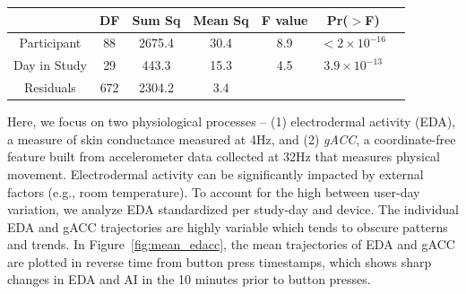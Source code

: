 \documentclass[12pt]{amsart}
\begin{document}
\begin{table}[!th]
\begin{tabular}{ccccccc}\hline
      & DF & Sum Sq & Mean Sq & F value & Pr($>$F) \\ \hline
        Participant & 88 & 2675.4 & 30.4 & 8.9 & $< 2 \times 10^{-16}$ \\
        Day in Study & 29 & 443.3 & 15.3 & 4.5 & $3.9 \times 10^{-13}$ \\
        Residuals & 672 & 2304.2 & 3.4 \\ \hline
      \end{tabular}  
      \label{tab:anova}
\end{table}

Here, we focus on two physiological processes -- (1) electrodermal activity (EDA), a measure of skin conductance measured at 4Hz, and  (2) \emph{gACC}, a coordinate-free feature built from accelerometer data collected at 32Hz that measures physical movement.  Electrodermal activity can be significantly impacted by external factors (e.g., room temperature).  To account for the high between user-day variation, we analyze EDA standardized per study-day and  device. The individual EDA and gACC trajectories are highly variable which tends to obscure patterns and trends.  In Figure~\ref{fig:mean_edacc}, the mean trajectories of EDA and gACC are plotted in reverse time from button press timestamps, which shows sharp changes in EDA and AI in the 10 minutes prior to button presses.
\end{document}
